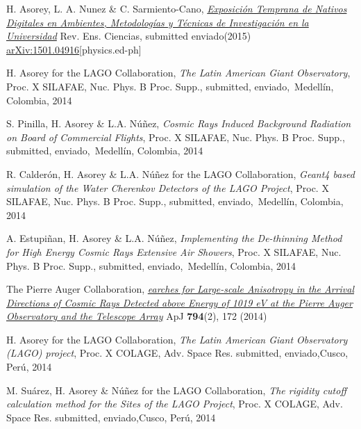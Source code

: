 \begin{etaremune}
\item {} H. Asorey, L. A. Nunez \& C. Sarmiento-Cano, \href{http://dx.doi.org/}{\emph{Exposición Temprana de Nativos Digitales en Ambientes, Metodologías y Técnicas de Investigación en la Universidad}} Rev. Ens. Ciencias, \ifeng submitted \else enviado\fi (2015) \href{http://arxiv.org/abs/1501.04916}{arXiv:1501.04916}[physics.ed-ph]

\item {}H. Asorey for the LAGO Collaboration, {\emph{The Latin American Giant Observatory}}, \en Proc. X SILAFAE, Nuc. Phys. B Proc. Supp., \ifeng submitted, \else enviado,\fi\ Medellín, Colombia, 2014

\item {}S. Pinilla, H. Asorey \& L.A. Núñez, {\emph{Cosmic Rays Induced Background Radiation on Board of Commercial Flights}}, \en Proc. X SILAFAE, Nuc. Phys. B Proc. Supp., \ifeng submitted, \else enviado,\fi\ Medellín, Colombia, 2014

\item {}R. Calderón, H. Asorey \& L.A. Núñez for the LAGO Collaboration, {\emph{Geant4 based simulation of the Water Cherenkov Detectors of the LAGO Project}}, \en Proc. X SILAFAE, Nuc. Phys. B Proc. Supp., \ifeng submitted, \else enviado,\fi\ Medellín, Colombia, 2014

\item {}A. Estupiñan, H. Asorey \& L.A. Núñez, {\emph{Implementing the De-thinning Method for High Energy Cosmic Rays Extensive Air Showers}}, \en Proc. X SILAFAE, Nuc. Phys. B Proc. Supp., \ifeng submitted, \else enviado,\fi\ Medellín, Colombia, 2014

\item {}The Pierre Auger Collaboration, \href{http://dx.doi.org/10.1088/0004-637X/794/2/172}{\emph{earches for Large-scale Anisotropy in the Arrival Directions of Cosmic Rays Detected above Energy of 1019 eV at the Pierre Auger Observatory and the Telescope Array}} ApJ {\bf{794}}(2), 172 (2014)

\item {}H. Asorey for the LAGO Collaboration, {\emph{The Latin American Giant Observatory (LAGO) project}}, \en Proc. X COLAGE, Adv. Space Res. \ifeng submitted, \else enviado,\fi  Cusco, Perú, 2014

\item {}M. Suárez, H. Asorey \& Núñez for the LAGO Collaboration, {\emph{The rigidity cutoff calculation method for the Sites of the LAGO Project}}, \en Proc. X COLAGE, Adv. Space Res. \ifeng submitted, \else enviado,\fi  Cusco, Perú, 2014


\end{etaremune}

